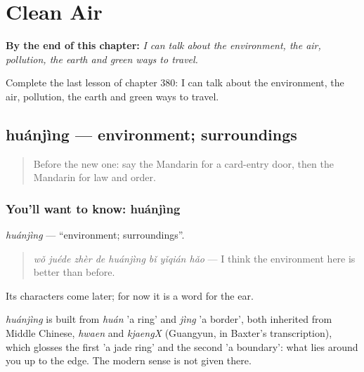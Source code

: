 
\chapter{Clean Air}
\label{ch:zh-clean-air}

\begin{chapteropening}
\textbf{By the end of this chapter:} \emph{I can talk about the environment, the air, pollution, the earth and green ways to travel.}

Complete the last lesson of chapter 380: I can talk about the environment, the air, pollution, the earth and green ways to travel.
\end{chapteropening}

\section[huánjìng]{huánjìng — environment; surroundings}

\label{lesson:ZH-C380-huanjing}



\begin{quote}
Before the new one: say the Mandarin for a card-entry door, then the Mandarin for law and order.
\end{quote}

\subsection*{You'll want to know: huánjìng}
\emph{huánjìng} — \textquotedblleft{}environment; surroundings\textquotedblright{}.

\begin{quote}
\emph{wǒ juéde zhèr de huánjìng bǐ yǐqián hǎo} — I think the environment here is better than before.
\end{quote}

Its characters come later; for now it is a word for the ear.

\begin{cousinweb}
\emph{huánjìng} is built from \emph{huán} 'a ring' and \emph{jìng} 'a border', both inherited from Middle Chinese, \emph{hwaen} and \emph{kjaengX} (Guangyun, in Baxter's transcription), which glosses the first 'a jade ring' and the second 'a boundary': what lies around you up to the edge. The modern sense is not given there.
\end{cousinweb}

